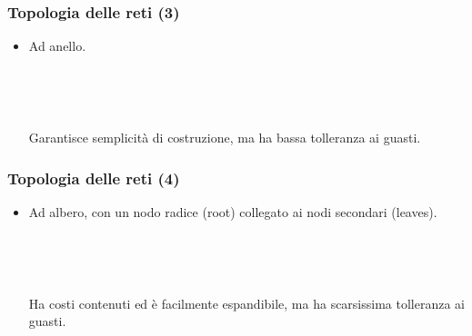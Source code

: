 \documentclass[]{beamer}
\begin{document}
\begin{frame}
\frametitle{Topologia delle reti (3)}
  \begin{itemize}
    \item Ad \alert<1->{anello}.
    
    ~

    \pause

    ~

    Garantisce semplicità di costruzione, ma ha bassa tolleranza ai guasti.
  \end{itemize}
\end{frame}


\begin{frame}
\frametitle{Topologia delle reti (4)}
  \begin{itemize}
    \item Ad \alert<1->{albero}, con un nodo radice (root) collegato ai nodi secondari (leaves).
    
    ~

    \pause

    ~

    Ha costi contenuti ed è facilmente espandibile, ma ha scarsissima tolleranza ai guasti.
  \end{itemize}
\end{frame}
\end{document}
